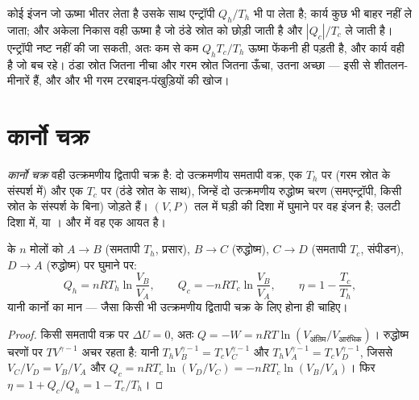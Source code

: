 \begin{remark}[दक्षता~1 क्यों नहीं हो सकती]\label{rem:b1:heat-engines:why}
कोई इंजन जो ऊष्मा भीतर लेता है उसके साथ एन्ट्रॉपी $Q_h/T_h$ भी पा लेता है;
कार्य कुछ भी बाहर नहीं ले जाता; और अकेला निकास वही ऊष्मा है जो ठंडे स्रोत
को छोड़ी जाती है और $|Q_c|/T_c$ ले जाती है। एन्ट्रॉपी नष्ट नहीं की जा सकती,
अतः कम से कम $Q_h T_c/T_h$ ऊष्मा फेंकनी ही पड़ती है, और कार्य वही है जो बच
रहे। ठंडा स्रोत जितना नीचा और गरम स्रोत जितना ऊँचा, उतना अच्छा --- इसी से
शीतलन-मीनारें हैं, और और भी गरम टरबाइन-पंखुड़ियों की खोज।
\end{remark}

\section{कार्नो चक्र}

\begin{definition}[कार्नो चक्र]\label{def:b1:heat-engines:carnotcycle}
\emph{कार्नो चक्र} वही उत्क्रमणीय द्वितापी चक्र है: दो उत्क्रमणीय समतापी
वक्र, एक $T_h$ पर (गरम स्रोत के संस्पर्श में) और एक $T_c$ पर (ठंडे स्रोत
के साथ), जिन्हें दो उत्क्रमणीय रुद्धोष्म चरण (समएन्ट्रॉपी, किसी स्रोत के
संस्पर्श के बिना) जोड़ते हैं। $(V, P)$ तल में घड़ी की दिशा में घुमाने पर वह
इंजन है; उलटी दिशा में,  या । और  में वह एक
आयत है।
\end{definition}

\begin{proposition}[आदर्श गैस का कार्नो चक्र]\label{prop:b1:heat-engines:carnotgas}
 के $n$ मोलों को $A \to B$ (समतापी $T_h$, प्रसार), $B \to C$
(रुद्धोष्म), $C \to D$ (समतापी $T_c$, संपीडन), $D \to A$ (रुद्धोष्म) पर
घुमाने पर:
\[
Q_h = nRT_h\ln\frac{V_B}{V_A}, \qquad
Q_c = -nRT_c\ln\frac{V_B}{V_A}, \qquad
\eta = 1 - \frac{T_c}{T_h} ,
\]
यानी कार्नो का मान --- जैसा किसी भी उत्क्रमणीय द्वितापी चक्र के लिए होना ही चाहिए।
\end{proposition}

\begin{proof}
किसी समतापी वक्र पर $\Delta U = 0$, अतः $Q = -W = nRT\ln(V_{\text{अंतिम}}/
V_{\text{आरंभिक}})$।
रुद्धोष्म चरणों पर $TV^{\gamma-1}$ अचर रहता है:
यानी $T_hV_B^{\gamma-1} = T_cV_C^{\gamma-1}$
और $T_hV_A^{\gamma-1} = T_cV_D^{\gamma-1}$, जिससे $V_C/V_D = V_B/V_A$ और $Q_c = nRT_c\ln(V_D/V_C) =
-nRT_c\ln(V_B/V_A)$। फिर $\eta = 1 + Q_c/Q_h = 1 - T_c/T_h$।
\end{proof}

